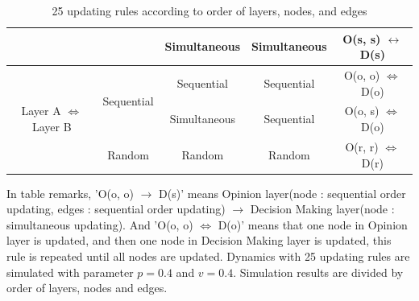 \begin{table}[htp]
\begin{center}
\begin{tabular}{c|c|c|c|c}
			&                                & Simultaneous                       & Simultaneous           & O(s, s) $\leftrightarrow$ D(s) \\ \hline
			\multirow{3}{*}{Layer A $\Leftrightarrow$ Layer B}& \multirow{2}{*}{Sequential}  & Sequential                         & Sequential             & O(o, o) $\Leftrightarrow$ D(o) \\ \cline{3-5}
			&                                & Simultaneous                       & Sequential             & O(o, s) $\Leftrightarrow$ D(o) \\ \cline{2-5}
			& Random                         & Random                             & Random                 & O(r, r) $\Leftrightarrow$ D(r) \\ \hline
			
		\end{tabular}
	\end{center}
	\caption{25 updating rules according to order of layers, nodes, and edges}
	\label{table1}
\end{table}

In table remarks, 'O(o, o) $\to$ D(s)’ means Opinion layer(node : sequential order updating, edges : sequential order updating) $\to$ Decision Making layer(node : simultaneous updating). And 'O(o, o) $\Leftrightarrow$ D(o)’ means that one node in Opinion layer is updated, and then one node in Decision Making layer is updated, this rule is repeated until all nodes are updated.
Dynamics with 25 updating rules are simulated with parameter $p=0.4$ and $v=0.4$. Simulation results are divided by order of layers, nodes and edges. 

